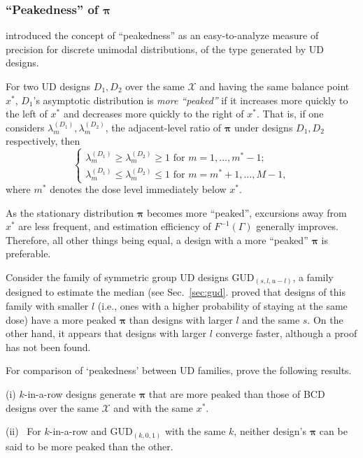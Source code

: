 \subsubsection{``Peakedness'' of $\boldsymbol{\pi}$}

\cite{Giov:Pint:Pint:prop:1998} introduced the concept of ``peakedness'' as an easy-to-analyze measure of precision for discrete unimodal distributions, of the type generated by UD designs. 

\begin{defn}\label{def:peak}
For two UD designs $D_1,D_2$ over the same $\mathcal{X}$ and having the same balance point $x^*$, $D_1$'s asymptotic distribution is \emph{more ``peaked''} if it increases more quickly to the left of $x^*$ and decreases more quickly to the right of $x^*$. That is, if one considers $\lambda^{(D_1)}_m,\lambda^{(D_2)}_m$, the adjacent-level ratio of $\boldsymbol{\pi}$ under designs $D_1,D_2$ respectively, then
\begin{equation}\label{eq:peakdef}
\begin{cases}
\lambda^{(D_1)}_{m}\ge\lambda^{(D_2)}_{m}\ge 1\textrm{ for }m=1,\ldots,m^*-1; \\
\lambda^{(D_1)}_{m}\le\lambda^{(D_2)}_{m} \le 1\textrm{ for }m = m^*+1,\ldots,M-1,
\end{cases}
\end{equation}
where $m^*$ denotes the dose level immediately below $x^*$.
\end{defn}

As the stationary distribution $\boldsymbol{\pi}$ becomes more ``peaked'', excursions away from $x^*$ are less frequent, and estimation efficiency of $F^{-1}\left(\Gamma\right)$ generally improves. Therefore, all other things being equal, a design with a more ``peaked'' $\boldsymbol{\pi}$ is preferable.

Consider the family of symmetric group UD designs GUD$_{(s,l,u-l)}$, a family designed to estimate the median (see Sec.~\ref{sec:gud}. \cite{Oron07} proved that designs of this family with smaller $l$ (i.e., ones with a higher probability of staying at the same dose) have a more peaked $\boldsymbol{\pi}$ than designs with larger $l$ and the same $s$. On the other hand, it appears that designs with larger $l$ converge faster, although a proof has not been found.

For comparison of `peakedness' between UD families, \cite{Oron:Hoff:thek:2009} prove the following results.

\begin{thm}\label{thm:peak} (i) $k$-in-a-row designs generate $\boldsymbol{\pi}$ that are more peaked than those of BCD designs over the same $\mathcal{X}$ and with the same $x^*$.

\noindent (ii) \ For $k$-in-a-row and GUD$_{(k,0,1)}$ with the same $k$, neither design's $\boldsymbol{\pi}$ can be said to be more peaked than the other.
\end{thm}

